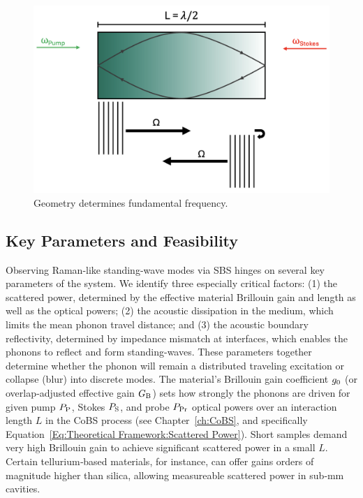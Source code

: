 \begin{figure}[t]
  \centering
  \includegraphics[width=.85\textwidth]{figs/4-Raman/GeometryDeterminesFundamentalFreq.png}
  \caption{Geometry determines fundamental frequency.}
  \label{fig:Raman:GeometryDeterminesFundamentalFreq}
\end{figure}

\subsection{Key Parameters and Feasibility}
\label{subsec:Raman:KeyParametersandFeasibility}

Observing Raman-like standing-wave modes via \ac{SBS} hinges on several key parameters of the system. We identify three especially critical factors: (1) the scattered power, determined by the effective material Brillouin gain and length as well as the optical powers; (2) the acoustic dissipation in the medium, which limits the mean phonon travel distance; and (3) the acoustic boundary reflectivity, determined by impedance mismatch at interfaces, which enables the phonons to reflect and form standing-waves. These parameters together determine whether the phonon will remain a distributed traveling excitation or collapse (blur) into discrete modes. The material’s Brillouin gain coefficient \(g_{\rm 0}\) (or overlap‐adjusted effective gain \(G_{\rm B}\)) sets how strongly the phonons are driven for given pump \(P_{\rm P}\), Stokes \(P_{\rm S}\), and probe \(P_{\rm Pr}\) optical powers over an interaction length \(L\) in the \ac{CoBS} process (see Chapter~\ref{ch:CoBS}, and specifically Equation~\ref{Eq:Theoretical Framework:Scattered Power}).  Short samples demand very high Brillouin gain to achieve significant scattered power in a small \(L\). Certain tellurium‐based materials, for instance, can offer gains orders of magnitude higher than silica, \cite{sanghera2010nonlinear, abedin2005observation} allowing measureable scattered power in sub‐\si{\milli\meter} cavities.

